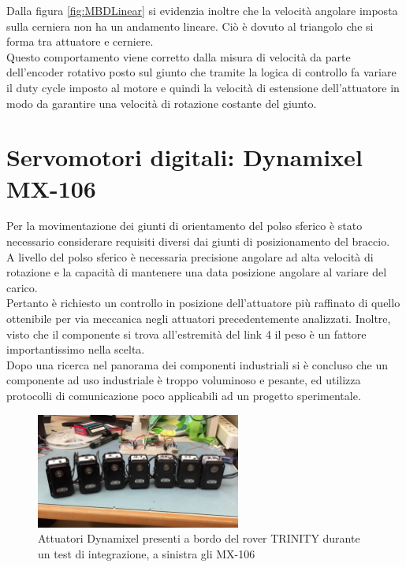 \documentclass[%
corpo=11pt,
twoside,
 stile=classica,
oldstyle,
greek,%
]{toptesi}
\begin{document}
	 Dalla figura \ref{fig:MBDLinear} si evidenzia inoltre che la velocità angolare imposta sulla cerniera non ha un andamento lineare. Ciò è dovuto al triangolo che si forma tra attuatore e cerniere. \\
	Questo comportamento viene corretto dalla misura di velocità da parte dell'encoder rotativo posto sul giunto che tramite la logica di controllo fa variare il duty cycle imposto al motore e quindi la velocità di estensione dell'attuatore in modo da garantire una velocità di rotazione costante del giunto. 
	
	
		
	\section{Servomotori digitali: Dynamixel MX-106}
	Per la movimentazione dei giunti di orientamento del polso sferico è stato necessario considerare requisiti diversi dai giunti di posizionamento del braccio.\\
	 A livello del polso sferico è necessaria precisione angolare ad alta velocità di rotazione e la capacità di mantenere una data posizione angolare al variare del carico.\\
	  Pertanto è richiesto un controllo in posizione dell'attuatore più raffinato di quello ottenibile per via meccanica negli attuatori precedentemente analizzati. Inoltre, visto che il componente si trova all'estremità del link 4 il peso è un fattore importantissimo nella scelta. \\
	Dopo una ricerca nel panorama dei componenti industriali si è concluso che un componente ad uso industriale è troppo voluminoso e pesante, ed utilizza protocolli di comunicazione poco applicabili ad un progetto sperimentale. 
	
	\begin{figure}
		\centering
		\includegraphics[width=0.6\textwidth]{image/dynamixel.png}
		\caption{Attuatori Dynamixel presenti a bordo del rover TRINITY durante un test di integrazione, a sinistra gli MX-106}
		\label{fig:MX160}
	\end{figure}
\end{document}
